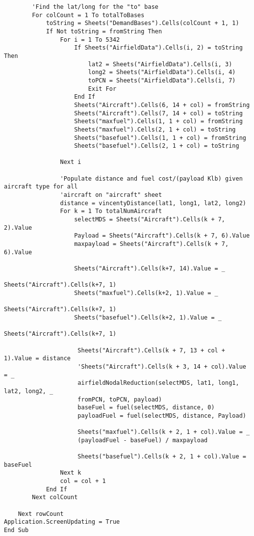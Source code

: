 \begin{lstlisting}
        'Find the lat/long for the "to" base
        For colCount = 1 To totalToBases
            toString = Sheets("DemandBases").Cells(colCount + 1, 1)
            If Not toString = fromString Then
                For i = 1 To 5342
                    If Sheets("AirfieldData").Cells(i, 2) = toString Then
                        lat2 = Sheets("AirfieldData").Cells(i, 3)
                        long2 = Sheets("AirfieldData").Cells(i, 4)
                        toPCN = Sheets("AirfieldData").Cells(i, 7)
                        Exit For
                    End If
                    Sheets("Aircraft").Cells(6, 14 + col) = fromString
                    Sheets("Aircraft").Cells(7, 14 + col) = toString
                    Sheets("maxfuel").Cells(1, 1 + col) = fromString
                    Sheets("maxfuel").Cells(2, 1 + col) = toString
                    Sheets("basefuel").Cells(1, 1 + col) = fromString
                    Sheets("basefuel").Cells(2, 1 + col) = toString
                
                Next i
                
                'Populate distance and fuel cost/(payload Klb) given aircraft type for all 
                'aircraft on "aircraft" sheet
                distance = vincentyDistance(lat1, long1, lat2, long2)
                For k = 1 To totalNumAircraft
                    selectMDS = Sheets("Aircraft").Cells(k + 7, 2).Value
                    Payload = Sheets("Aircraft").Cells(k + 7, 6).Value
                    maxpayload = Sheets("Aircraft").Cells(k + 7, 6).Value
                    
                    Sheets("Aircraft").Cells(k+7, 14).Value = _
                                                        Sheets("Aircraft").Cells(k+7, 1)
                    Sheets("maxfuel").Cells(k+2, 1).Value = _
                                                        Sheets("Aircraft").Cells(k+7, 1)
                    Sheets("basefuel").Cells(k+2, 1).Value = _ 
                                                        Sheets("Aircraft").Cells(k+7, 1)
                    
                     Sheets("Aircraft").Cells(k + 7, 13 + col + 1).Value = distance
                     'Sheets("Aircraft").Cells(k + 3, 14 + col).Value = _
                     airfieldNodalReduction(selectMDS, lat1, long1, lat2, long2, _
                     fromPCN, toPCN, payload)
                     baseFuel = fuel(selectMDS, distance, 0)
                     payloadFuel = fuel(selectMDS, distance, Payload)
                     
                     Sheets("maxfuel").Cells(k + 2, 1 + col).Value = _
                     (payloadFuel - baseFuel) / maxpayload
                     
                     Sheets("basefuel").Cells(k + 2, 1 + col).Value = baseFuel
                Next k
                col = col + 1
            End If
        Next colCount
        
    Next rowCount
Application.ScreenUpdating = True
End Sub

\end{lstlisting}

